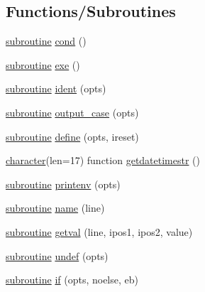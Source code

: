 \subsection*{Functions/\+Subroutines}
\begin{DoxyCompactItemize}
\item 
\hyperlink{M__stopwatch_83_8txt_acfbcff50169d691ff02d4a123ed70482}{subroutine} \hyperlink{namespacem__fpp_a3aa7c291b265d02ad91b3bb29e797156}{cond} ()
\item 
\hyperlink{M__stopwatch_83_8txt_acfbcff50169d691ff02d4a123ed70482}{subroutine} \hyperlink{namespacem__fpp_a1149aa9cc5620d40fa315e4de3937776}{exe} ()
\item 
\hyperlink{M__stopwatch_83_8txt_acfbcff50169d691ff02d4a123ed70482}{subroutine} \hyperlink{namespacem__fpp_afe91155aa0c891fc35f3927e777440ea}{ident} (opts)
\item 
\hyperlink{M__stopwatch_83_8txt_acfbcff50169d691ff02d4a123ed70482}{subroutine} \hyperlink{namespacem__fpp_aeab3b5145d977b953ea972b2882e442a}{output\+\_\+case} (opts)
\item 
\hyperlink{M__stopwatch_83_8txt_acfbcff50169d691ff02d4a123ed70482}{subroutine} \hyperlink{namespacem__fpp_a43f195db2d7dcdbaf89cb2e45ca60421}{define} (opts, ireset)
\item 
\hyperlink{option__stopwatch_83_8txt_abd4b21fbbd175834027b5224bfe97e66}{character}(len=17) function \hyperlink{namespacem__fpp_aa52b30ff734a7831d3334aee5ef4e8e7}{getdatetimestr} ()
\item 
\hyperlink{M__stopwatch_83_8txt_acfbcff50169d691ff02d4a123ed70482}{subroutine} \hyperlink{namespacem__fpp_a8034546d38694c17677cf638e2760d43}{printenv} (opts)
\item 
\hyperlink{M__stopwatch_83_8txt_acfbcff50169d691ff02d4a123ed70482}{subroutine} \hyperlink{namespacem__fpp_ac32c830615f875efaf8678759daa7f39}{name} (line)
\item 
\hyperlink{M__stopwatch_83_8txt_acfbcff50169d691ff02d4a123ed70482}{subroutine} \hyperlink{namespacem__fpp_a77ebcaafb7e1396c68dbc0bdcc088232}{getval} (line, ipos1, ipos2, value)
\item 
\hyperlink{M__stopwatch_83_8txt_acfbcff50169d691ff02d4a123ed70482}{subroutine} \hyperlink{namespacem__fpp_aa3c22b47ddfcf47940f8254d4a44c448}{undef} (opts)
\item 
\hyperlink{M__stopwatch_83_8txt_acfbcff50169d691ff02d4a123ed70482}{subroutine} \hyperlink{namespacem__fpp_a4866adfbe17fb5cc245f2ad058bb47f2}{if} (opts, noelse, eb)
\item 

\end{DoxyCompactItemize}
